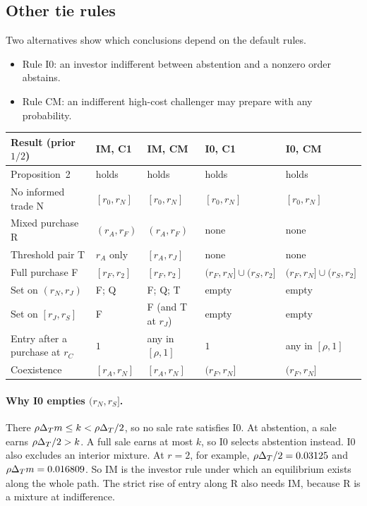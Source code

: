 \subsection{Other tie rules}\label{sec:08_coexistence-ties}

Two alternatives show which conclusions depend on the default rules.
\begin{itemize}[leftmargin=2em]
\item Rule I0: an investor indifferent between abstention and a nonzero order abstains.
\item Rule CM: an indifferent high-cost challenger may prepare with any probability.
\end{itemize}
\begin{center}\small
\begin{tabular}{@{}lllll@{}}
\toprule
Result (prior \(1/2\)) & IM, C1 & IM, CM & I0, C1 & I0, CM\\
\midrule
Proposition~2 & holds & holds & holds & holds\\
No informed trade N & \([r_0,r_N]\) & \([r_0,r_N]\) & \([r_0,r_N]\) & \([r_0,r_N]\)\\
Mixed purchase R & \((r_A,r_F)\) & \((r_A,r_F)\) & none & none\\
Threshold pair T & \(r_A\) only & \([r_A,r_J]\) & none & none\\
Full purchase F & \([r_F,r_2]\) & \([r_F,r_2]\) & \((r_F,r_N]\cup(r_S,r_2]\) & \((r_F,r_N]\cup(r_S,r_2]\)\\
Set on \((r_N,r_J)\) & F; Q & F; Q; T & empty & empty\\
Set on \([r_J,r_S]\) & F & F (and T at \(r_J\)) & empty & empty\\
Entry after a purchase at \(r_C\) & \(1\) & any in \([\rho,1]\) & \(1\) & any in \([\rho,1]\)\\
Coexistence & \([r_A,r_N]\) & \([r_A,r_N]\) & \((r_F,r_N]\) & \((r_F,r_N]\)\\
\bottomrule
\end{tabular}
\end{center}

\paragraph{Why I0 empties \((r_N,r_S]\).} There \(\rho\Delta_T m\le k<\rho\Delta_T/2\), so no sale rate satisfies I0.
At abstention, a sale earns \(\rho\Delta_T/2>k\).
A full sale earns at most \(k\), so I0 selects abstention instead.
I0 also excludes an interior mixture. At \(r=2\), for example, \(\rho\Delta_T/2=0.03125\) and \(\rho\Delta_T m=0.016809\).
So IM is the investor rule under which an equilibrium exists along the whole path. The strict rise of entry along R also
needs IM, because R is a mixture at indifference.


